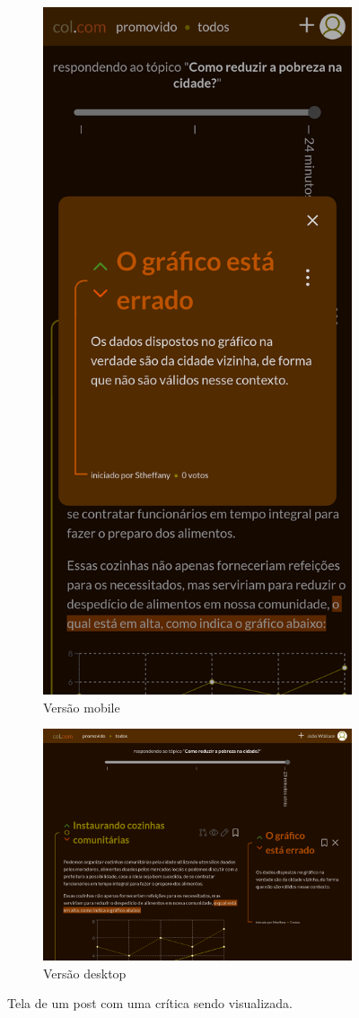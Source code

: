 \begin{figure}[hbt!]
\centering
\begin{subfigure}{.3\textwidth}
  \centering
  \includegraphics[width=.68\linewidth]{imagens/captures/m_post_critique.png}
  \caption{Versão mobile}
\end{subfigure}%
\begin{subfigure}{.7\textwidth}
  \centering
  \includegraphics[width=0.87\linewidth]{imagens/captures/post_critique.png}
  \caption{Versão desktop}
\end{subfigure}
\caption{Tela de um post com uma crítica sendo visualizada.}
\label{fig:postCritique}
\end{figure}


